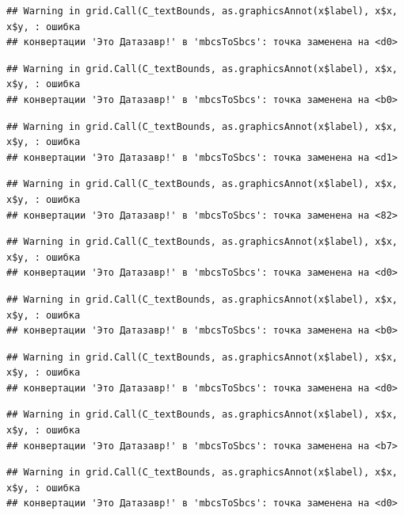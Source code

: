 \documentclass[]{book}
\begin{document}
\begin{verbatim}
## Warning in grid.Call(C_textBounds, as.graphicsAnnot(x$label), x$x, x$y, : ошибка
## конвертации 'Это Датазавр!' в 'mbcsToSbcs': точка заменена на <d0>
\end{verbatim}

\begin{verbatim}
## Warning in grid.Call(C_textBounds, as.graphicsAnnot(x$label), x$x, x$y, : ошибка
## конвертации 'Это Датазавр!' в 'mbcsToSbcs': точка заменена на <b0>
\end{verbatim}

\begin{verbatim}
## Warning in grid.Call(C_textBounds, as.graphicsAnnot(x$label), x$x, x$y, : ошибка
## конвертации 'Это Датазавр!' в 'mbcsToSbcs': точка заменена на <d1>
\end{verbatim}

\begin{verbatim}
## Warning in grid.Call(C_textBounds, as.graphicsAnnot(x$label), x$x, x$y, : ошибка
## конвертации 'Это Датазавр!' в 'mbcsToSbcs': точка заменена на <82>
\end{verbatim}

\begin{verbatim}
## Warning in grid.Call(C_textBounds, as.graphicsAnnot(x$label), x$x, x$y, : ошибка
## конвертации 'Это Датазавр!' в 'mbcsToSbcs': точка заменена на <d0>
\end{verbatim}

\begin{verbatim}
## Warning in grid.Call(C_textBounds, as.graphicsAnnot(x$label), x$x, x$y, : ошибка
## конвертации 'Это Датазавр!' в 'mbcsToSbcs': точка заменена на <b0>
\end{verbatim}

\begin{verbatim}
## Warning in grid.Call(C_textBounds, as.graphicsAnnot(x$label), x$x, x$y, : ошибка
## конвертации 'Это Датазавр!' в 'mbcsToSbcs': точка заменена на <d0>
\end{verbatim}

\begin{verbatim}
## Warning in grid.Call(C_textBounds, as.graphicsAnnot(x$label), x$x, x$y, : ошибка
## конвертации 'Это Датазавр!' в 'mbcsToSbcs': точка заменена на <b7>
\end{verbatim}

\begin{verbatim}
## Warning in grid.Call(C_textBounds, as.graphicsAnnot(x$label), x$x, x$y, : ошибка
## конвертации 'Это Датазавр!' в 'mbcsToSbcs': точка заменена на <d0>
\end{verbatim}
\end{document}
